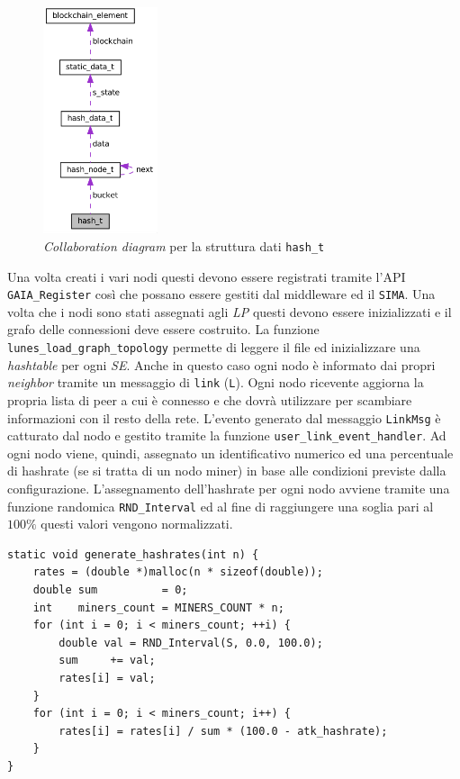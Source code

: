 \begin{figure}
    \centering
    \includegraphics[width=0.3\textwidth]{images/collaboration_hasht.png}
    \caption{\textit{Collaboration diagram} per la struttura dati \texttt{hash\_t}}
\end{figure}
Una volta creati i vari nodi questi devono essere registrati tramite l'API \texttt{GAIA\_Register} così che possano essere gestiti dal middleware ed il \texttt{SIMA}. Una volta che i nodi sono stati assegnati agli \textit{LP} questi devono essere inizializzati e il grafo delle connessioni deve essere costruito.\newline
La funzione \texttt{lunes\_load\_graph\_topology} permette di leggere il file ed inizializzare una \textit{hashtable} per ogni \textit{SE}. Anche in questo caso ogni nodo è informato dai propri \textit{neighbor} tramite un messaggio di \texttt{link} (\texttt{L}). Ogni nodo ricevente aggiorna la propria lista di peer a cui è connesso e che dovrà utilizzare per scambiare informazioni con il resto della rete. L'evento generato dal messaggio \texttt{LinkMsg} è catturato dal nodo e gestito tramite la funzione \texttt{user\_link\_event\_handler}. Ad ogni nodo viene, quindi, assegnato un identificativo numerico ed una percentuale di hashrate (se si tratta di un nodo miner) in base alle condizioni previste dalla configurazione. L'assegnamento dell'hashrate per ogni nodo avviene tramite una funzione randomica \texttt{RND\_Interval} ed al fine di raggiungere una soglia pari al $100\%$ questi valori vengono normalizzati.
\begin{code}
\begin{verbatim}
static void generate_hashrates(int n) {
    rates = (double *)malloc(n * sizeof(double));
    double sum          = 0;
    int    miners_count = MINERS_COUNT * n;
    for (int i = 0; i < miners_count; ++i) {
        double val = RND_Interval(S, 0.0, 100.0);
        sum     += val;
        rates[i] = val;
    }
    for (int i = 0; i < miners_count; i++) {
        rates[i] = rates[i] / sum * (100.0 - atk_hashrate);
    }
}
\end{verbatim}
\end{code}
